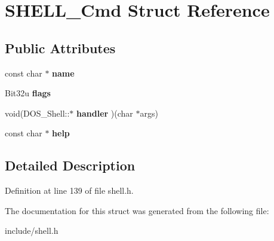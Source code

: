 \hypertarget{structSHELL__Cmd}{\section{S\-H\-E\-L\-L\-\_\-\-Cmd Struct Reference}
\label{structSHELL__Cmd}
}
\subsection*{Public Attributes}
\begin{DoxyCompactItemize}
\item 
\hypertarget{structSHELL__Cmd_a6c2bf878ebb62d9d05eed4e6228ff04b}{const char $\ast$ {\bfseries name}}\label{structSHELL__Cmd_a6c2bf878ebb62d9d05eed4e6228ff04b}

\item 
\hypertarget{structSHELL__Cmd_ae3518365a82721ce9f0b88ba409a36aa}{Bit32u {\bfseries flags}}\label{structSHELL__Cmd_ae3518365a82721ce9f0b88ba409a36aa}

\item 
\hypertarget{structSHELL__Cmd_a8ab69bb42cfd5dd8ca2cf15ce980ebf4}{void(D\-O\-S\-\_\-\-Shell\-::$\ast$ {\bfseries handler} )(char $\ast$args)}\label{structSHELL__Cmd_a8ab69bb42cfd5dd8ca2cf15ce980ebf4}

\item 
\hypertarget{structSHELL__Cmd_a3712fa3ab7cdfbbb384eee27e23b07f2}{const char $\ast$ {\bfseries help}}\label{structSHELL__Cmd_a3712fa3ab7cdfbbb384eee27e23b07f2}

\end{DoxyCompactItemize}


\subsection{Detailed Description}


Definition at line 139 of file shell.\-h.



The documentation for this struct was generated from the following file\-:\begin{DoxyCompactItemize}
\item 
include/shell.\-h\end{DoxyCompactItemize}
